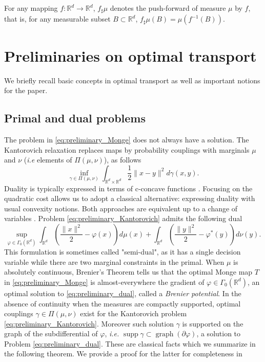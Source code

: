 \documentclass[11pt]{article}
\DeclareMathOperator{\supp}{supp}
\DeclareMathOperator{\graph}{graph}
\newcommand{\R}{\mathbb R}
\newcommand{\1}{\mathbbm{1}}
\numberwithin{equation}{section}
\begin{document}
For any mapping $f:\R^d\to \R^d$, $f_\sharp\mu$ denotes the push-forward of measure $\mu$ by $f$, that is, for any measurable subset $B\subset\R^d$, $f_\sharp\mu(B)=\mu(f^{-1}(B))$.

\section{Preliminaries on optimal transport}
\label{sec:preliminary}
We briefly recall basic concepts in optimal transport as well as important notions for the paper.

\subsection{Primal and dual problems}

The problem in \eqref{eq:preliminary_Monge} does not always have a solution. The Kantorovich relaxation replaces maps by probability couplings with marginals $\mu$ and $\nu$ (\textit{i.e} elements of $\Pi(\mu,\nu)$), as follows
\begin{equation}
    \label{eq:preliminary_Kantorovich}
    \inf_{\gamma\in\Pi(\mu,\nu)}\int_{\R^d\times \R^d}\frac{1}{2}\|x-y\|^2d\gamma(x,y).
\end{equation}
Duality is typically expressed in terms of c-concave functions \cite[Section 1.6.1]{book_santambrogio}. Focusing on the quadratic cost allows us to adopt a classical alternative: expressing duality with usual convexity notions. Both approaches are equivalent up to a change of variables \cite[Proposition 1.21]{book_santambrogio}. Problem \eqref{eq:preliminary_Kantorovich} admits the following dual
\begin{equation}\label{eq:preliminary_dual}
    \sup_{\varphi\in \Gamma_0(\R^d)}\int_{\R^d} \left(\frac{\|x\|^2}{2} - \varphi(x) \right)d\mu(x) + \int_{\R^d} \left(\frac{\|y\|^2}{2} - \varphi^*(y)\right) d\nu(y).
\end{equation}
This formulation is sometimes called "semi-dual", as it has a single decision variable while there are two marginal constraints in the primal. When $\mu$ is absolutely continuous, Brenier's Theorem tells us that the optimal Monge map $T$ in \eqref{eq:preliminary_Monge} is almost-everywhere the gradient of $\varphi \in \Gamma_0(\R^d)$, an optimal solution to \eqref{eq:preliminary_dual}, called a \textit{Brenier potential}. In the absence of continuity when the measures are compactly supported, optimal couplings $\gamma\in \Pi(\mu,\nu)$ exist for the Kantorovich problem \eqref{eq:preliminary_Kantorovich}. Moreover such solution $\gamma$ is supported on the graph of the subdifferential of $\varphi$, \textit{i.e.} $\supp \gamma \subset \graph(\partial \varphi)$, a solution to Problem \eqref{eq:preliminary_dual}. These are classical facts \cite{villani_opt_old_new,ref_villani_topics,book_santambrogio} which we  summarize in the following theorem. We provide a proof for the latter for completeness in 
\end{document}
